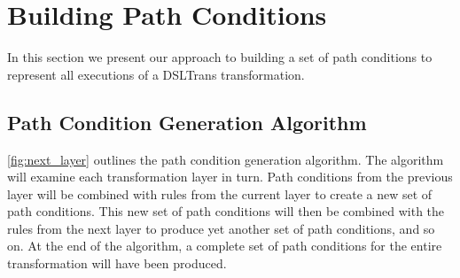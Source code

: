 \section{Building Path Conditions}
\label{sec:building_pcs}

In this section we present our approach to building a set of path conditions to represent all executions of a DSLTrans transformation.



\subsection{Path Condition Generation Algorithm}
\label{sec:gen_all_pcs}

\cref{fig:next_layer} outlines the path condition generation algorithm. The algorithm will examine each transformation layer in turn. Path conditions from the previous layer will be combined with rules from the current layer to create a new set of path conditions. This new set of path conditions will then be combined with the rules from the next layer to produce yet another set of path conditions, and so on. At the end of the algorithm, a complete set of path conditions for the entire transformation will have been produced. 

